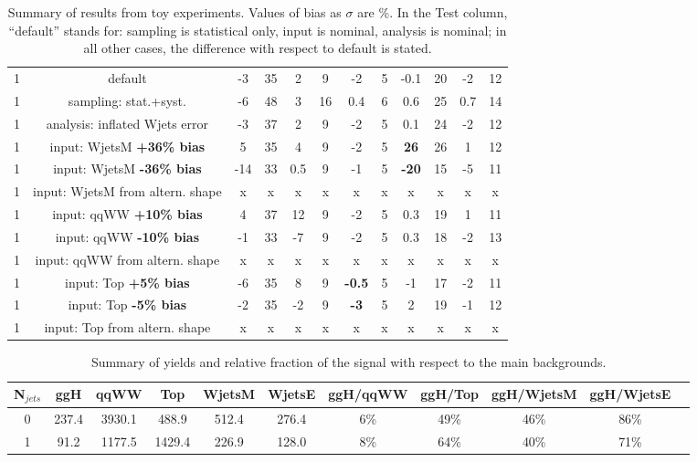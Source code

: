 \begin{table}
\begin{center}
\begin{tabular}{c | c  | c c | c c | c c | c c | c c }
\hline
\hline
1 & default                             & -3  & 35 & 2   & 9  & -2  & 5 & -0.1 & 20 & -2 & 12 \\
1 & sampling: stat.+syst.               & -6  & 48 & 3   & 16 & 0.4 & 6 & 0.6  & 25 & 0.7& 14 \\
\hline
1 & analysis: inflated Wjets error      &  -3 &  37 & 2  & 9 & -2  & 5  & 0.1  & 24  & -2  & 12\\ 
1 & input: WjetsM {\bf +36\% bias}      &  5  &  35 & 4  & 9 & -2  & 5  & {\bf 26} & 26  & 1   & 12\\ 
1 & input: WjetsM {\bf -36\% bias}      & -14 &  33 & 0.5& 9 & -1  & 5  & {\bf-20} & 15  & -5  & 11 \\ 
1 & input: WjetsM from altern. shape    &  x  &  x & x   & x & x   & x  & x   & x  & x   & x\\
\hline
1 & input: qqWW {\bf +10\% bias}        & 4   & 37 & 12  & 9 & -2  & 5  & 0.3  & 19 & 1  & 11 \\
1 & input: qqWW {\bf -10\% bias}        & -1  & 33 & -7  & 9 & -2  & 5  & 0.3  & 18 & -2 & 13 \\
1 & input: qqWW from altern. shape      & x   & x  & x   & x & x   & x  & x    & x  & x & x \\
\hline
1 & input: Top {\bf +5\% bias}          & -6  & 35  & 8  & 9 & {\bf -0.5} & 5 & -1  & 17 & -2 & 11 \\
1 & input: Top {\bf -5\% bias}          & -2  & 35 & -2  & 9 & {\bf -3} & 5 & 2  & 19 & -1 & 12 \\
1 & input: Top from altern. shape       & x   & x  & x & x & x & x & x  & x & x & x \\
\hline
\hline
\end{tabular}
\caption{Summary of results from toy experiments. Values of bias as $\sigma$ are \%.
In the Test column, ``default'' stands for: sampling is statistical only, input is nominal, analysis is nominal; 
in all other cases, the difference with respect to default is stated.}
\label{tab:toy_summary}
\end{center}
\end{table}


\begin{table}
\begin{center}
\begin{tabular}{c | c c c c c | c  c  c c c }
\hline
N$_{jets}$ & ggH & qqWW & Top & WjetsM & WjetsE & ggH/qqWW & ggH/Top & ggH/WjetsM & ggH/WjetsE \\
\hline
0 & 237.4 & 3930.1 & 488.9  & 512.4 & 276.4 & 6\% & 49\% & 46\% &  86\%\\
1 & 91.2  & 1177.5 & 1429.4 & 226.9 & 128.0 & 8\% & 64\% & 40\% &  71\%\\
\hline
\end{tabular}
\caption{Summary of yields and relative fraction of the signal with respect to the main backgrounds.}
\label{tab:yield_summary}
\end{center}
\end{table}

